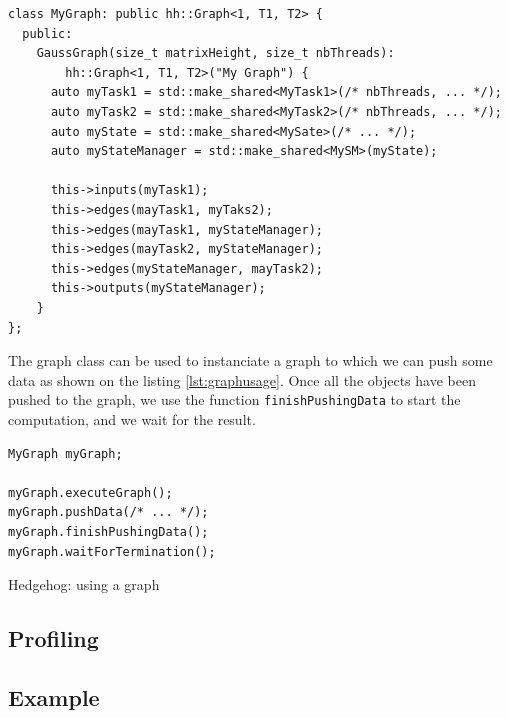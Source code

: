 \begin{listing}[ht!]
\begin{verbatim}
class MyGraph: public hh::Graph<1, T1, T2> {
  public:
    GaussGraph(size_t matrixHeight, size_t nbThreads):
        hh::Graph<1, T1, T2>("My Graph") {
      auto myTask1 = std::make_shared<MyTask1>(/* nbThreads, ... */);
      auto myTask2 = std::make_shared<MyTask2>(/* nbThreads, ... */);
      auto myState = std::make_shared<MySate>(/* ... */);
      auto myStateManager = std::make_shared<MySM>(myState);

      this->inputs(myTask1);
      this->edges(mayTask1, myTaks2);
      this->edges(mayTask1, myStateManager);
      this->edges(mayTask2, myStateManager);
      this->edges(myStateManager, mayTask2);
      this->outputs(myStateManager);
    }
};
\end{verbatim}
\label{lst:graph}
\end{listing}

The graph class can be used to instanciate a graph to which we can push some
data as shown on the listing \ref{lst:graphusage}. Once all the objects have been
pushed to the graph, we use the function \texttt{finishPushingData} to start the
computation, and we wait for the result.

\begin{listing}[ht!]
\begin{verbatim}
MyGraph myGraph;

myGraph.executeGraph();
myGraph.pushData(/* ... */);
myGraph.finishPushingData();
myGraph.waitForTermination();
\end{verbatim}
\caption{Hedgehog: using a graph}
\label{lst:graphusage}
\end{listing}

\subsection{Profiling}


\subsection{Example}
